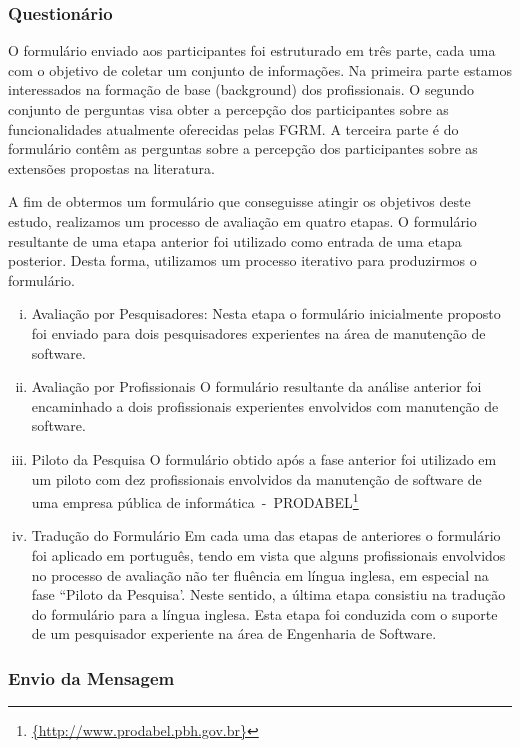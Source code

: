 \subsubsection{Questionário}
\label{subsec:questionario}

O formulário enviado aos participantes foi estruturado em três parte, cada uma
com o objetivo de coletar um conjunto de informações. Na primeira parte estamos
interessados na formação de base (background) dos profissionais. O segundo
conjunto de perguntas visa obter a percepção dos participantes sobre as
funcionalidades atualmente oferecidas pelas FGRM\@. A terceira parte é do
formulário contêm as perguntas sobre a percepção dos participantes sobre as
extensões propostas na literatura.

A fim de obtermos um formulário que conseguisse atingir os objetivos deste
estudo, realizamos um processo de avaliação em quatro etapas. O formulário
resultante de uma etapa anterior foi utilizado como entrada de uma etapa
posterior. Desta forma, utilizamos um processo iterativo para produzirmos o
formulário.
\begin{enumerate}[(i)]
	\item Avaliação por Pesquisadores: Nesta etapa o formulário inicialmente
		proposto foi enviado para dois pesquisadores experientes na área de
		manutenção de software.
	\item Avaliação por Profissionais O formulário resultante da análise
		anterior foi encaminhado a dois profissionais experientes envolvidos com
		manutenção de software.
	\item Piloto da Pesquisa O formulário obtido após a fase anterior foi
		utilizado em um piloto com
		dez profissionais envolvidos da manutenção de software de uma empresa
		pública de
		informática~-~PRODABEL\footnote{\url{{http://www.prodabel.pbh.gov.br}}}
	\item Tradução do Formulário Em cada uma das etapas de anteriores o
		formulário foi aplicado em
		português, tendo em vista que alguns profissionais envolvidos no
		processo de avaliação não
		ter fluência em língua inglesa, em especial na fase ``Piloto da
		Pesquisa'. Neste sentido, a última etapa  consistiu na tradução do
		formulário para a língua inglesa.  Esta etapa foi conduzida com  o
		suporte de um pesquisador experiente na área de Engenharia de Software.	
\end{enumerate}

\subsubsection{Envio da Mensagem}

